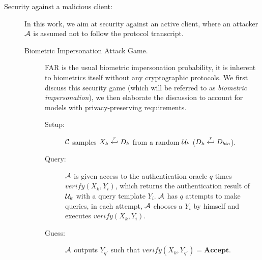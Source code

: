 \begin{description}
\item[Security against a malicious client:] In this work, we aim at security
  against an active client, where an attacker $\mathcal{A}$ is assumed not to
  follow the protocol transcript.
  \begin{description}
  \item[Biometric Impersonation Attack Game.] FAR is the usual biometric
    impersonation probability, it is inherent to biometrics itself without any
    cryptographic protocols. We first discuss this security game (which will be
    referred to as \textit{biometric impersonation}), we then elaborate the
    discussion to account for models with privacy-preserving requirements.
    \begin{description}
    \item[Setup:] $\mathcal{C}$ samples $X_k \stackrel{r}{\hookleftarrow} D_{k}$ from a random
      $\mathcal{U}_k$ ($D_k \stackrel{r}{\hookleftarrow} D_{bio}$).
    \item[Query:] $\mathcal{A}$ is given access to the authentication oracle $q$ times
      $verify(X_k,Y_{i})$, which returns the authentication result of $\mathcal{U}_k$ with
      a query template $Y_{i}$. $\mathcal{A}$ has $q$ attempts to make queries, in
      each attempt, $\mathcal{A}$ chooses a $Y_{i}$ by himself and executes
      $verify(X_k,Y_{i})$.
    \item[Guess:] $\mathcal{A}$ outputs $Y_{q'}$ such that
      $verify(X_k,Y_{q'}) = \textbf{Accept}$.
    \end{description}


\end{description}
\end{description}
